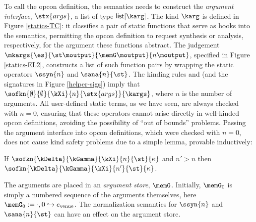 To call the opcon definition, the semantics needs to construct the \emph{argument interface}, $\stx{args}$, a list of type $\klist{\karg}$. %
The kind $\karg$ is defined in Figure \ref{statics-TC}: it classifies a pair of static functions that serve as hooks into the semantics, permitting the opcon definition to request synthesis or analysis, respectively, for the argument these functions abstract.  The judgement $\mkargs{\es}{\st\moutput}{\memG\moutput}{n\moutput}$, specified in Figure \ref{statics-EL2}, constructs a list of such function pairs by wrapping the static operators $\ssyn{n}$ and $\sana{n}{\st}$. The kinding rules  and  (and the signatures in Figure \ref{helper-sigs}) imply that $\sofkn{\emptyset}{\emptyset}{\kXi}{n}{\stx{args}}{\kargs}$, where $n$ is the number of arguments. All user-defined static terms, as we have seen, are always checked with $n=0$, ensuring that these operators cannot arise directly in well-kinded opcon definitions,  avoiding the possibility of ``out of bounds'' problems. Passing the argument interface into opcon definitions, which were checked with $n=0$, does not cause kind safety problems due to a simple lemma, provable inductively:
\begin{lemma}
If $\sofkn{\kDelta}{\kGamma}{\kXi}{n}{\st}{\kappa}$ and $n' > n$ then $\sofkn{\kDelta}{\kGamma}{\kXi}{n'}{\st}{\kappa}$.
\end{lemma}

The arguments are placed in an \emph{argument store}, $\memG$. Initially, $\memG_0$ is simply a numbered sequence of the arguments themselves, here $\memG_0 := \cdot, 0 \hookrightarrow e_\text{venue}$. The normalization semantics for $\ssyn{n}$ and $\sana{n}{\st}$ can have an effect on the argument store. 

